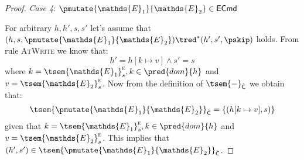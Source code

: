 \begin{lem}
{\begin{proof}
	\textit{Case 4}: $\pmutate{\mathds{E}_1}{\mathds{E}_2} \in \mathsf{ECmd}$
	
	For arbitrary $h, h', s, s'$ let's assume that $(h, s, \pmutate{\mathds{E}_1}{\mathds{E}_2}) \tred^* (h', s', \pskip)$ holds. From rule \textsc{AtWrite} we know that:
	\[
		h' = h[k \mapsto v] \land s' = s
	\]
	where $k = \tsem{\mathds{E}_1}^\textsc{e}_s, k \in \pred{dom}{h}$ and $v = \tsem{\mathds{E}_2}^\textsc{e}_s$. Now from  the definition of $\tsem{-}_{\hat{\mathsf{C}}}$ we obtain that:
	\[
		\tsem{\pmutate{\mathds{E}_1}{\mathds{E}_2}}_{\hat{\mathsf{C}}} = \{ (h[k \mapsto v], s) \}
	\]
	given that $k = \tsem{\mathds{E}_1}^\textsc{e}_s, k \in \pred{dom}{h}$ and $v = \tsem{\mathds{E}_2}^\textsc{e}_s$. This implies that $(h', s') \in \tsem{\pmutate{\mathds{E}_1}{\mathds{E}_2}}_{\hat{\mathsf{C}}}$.
	\end{proof}
	}
\end{lem}
